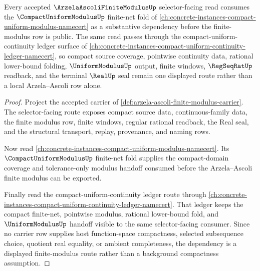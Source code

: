 \begin{theorem}
\label{thm:arzela-ascoli-finite-modulus-compact-uniform-modulus-dependency-route}
Every accepted $\ArzelaAscoliFiniteModulusUp$ selector-facing read consumes the $\CompactUniformModulusUp$ finite-net fold of \autoref{ch:concrete-instances-compact-uniform-modulus-namecert} as a substantive dependency before the finite-modulus row is public. The same read passes through the compact-uniform-continuity ledger surface of \autoref{ch:concrete-instances-compact-uniform-continuity-ledger-namecert}, so compact source coverage, pointwise continuity data, rational lower-bound folding, $\UniformModulusUp$ output, finite windows, $\RegSeqRatUp$ readback, and the terminal $\RealUp$ seal remain one displayed route rather than a local Arzela--Ascoli row alone.
\end{theorem}
\begin{proof}
Project the accepted carrier of \autoref{def:arzela-ascoli-finite-modulus-carrier}. The selector-facing route exposes compact source data, continuous-family data, the finite modulus row, finite windows, regular rational readback, the Real seal, and the structural transport, replay, provenance, and naming rows.

Now read \autoref{ch:concrete-instances-compact-uniform-modulus-namecert}. Its $\CompactUniformModulusUp$ finite-net fold supplies the compact-domain coverage and tolerance-only modulus handoff consumed before the Arzela--Ascoli finite modulus can be exported.

Finally read the compact-uniform-continuity ledger route through \autoref{ch:concrete-instances-compact-uniform-continuity-ledger-namecert}. That ledger keeps the compact finite-net, pointwise modulus, rational lower-bound fold, and $\UniformModulusUp$ handoff visible to the same selector-facing consumer. Since no carrier row supplies host function-space compactness, selected subsequence choice, quotient real equality, or ambient completeness, the dependency is a displayed finite-modulus route rather than a background compactness assumption.
\end{proof}
